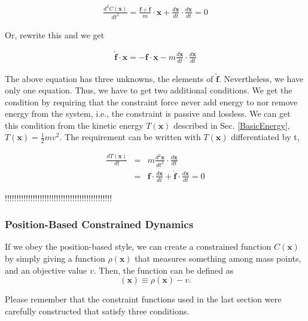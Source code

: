 \documentclass[pdflatex,sn-mathphys-num]{sn-jnl}%
\theoremstyle{thmstyleone}%
\theoremstyle{thmstyletwo}%
\theoremstyle{thmstylethree}%
\begin{document}
\begin{eqnarray}
	\frac{d^2 C(\boldsymbol{x})}{dt^2} = \frac{\boldsymbol{f}+\boldsymbol{\hat{f}}}{m}\cdot \boldsymbol{x} + \frac{d\boldsymbol{x}}{dt}\cdot\frac{d\boldsymbol{x}}{dt} = 0
\end{eqnarray}
 
Or, rewrite this and we get

\begin{eqnarray}
	\boldsymbol{\hat{f}} \cdot \boldsymbol{x} = -\boldsymbol{f}\cdot\boldsymbol{x} - m \frac{d\boldsymbol{x}}{dt}\cdot\frac{d\boldsymbol{x}}{dt}
\end{eqnarray}

The above equation has three unknowns, the elements of $\boldsymbol{\hat{f}}$. Nevertheless, we have only one equation. Thus, we have to get two additional conditions. We get the condition by requiring that the constraint force never add energy to nor remove energy from the system, i.e., the constraint is passive and lossless. We can get this condition from the kinetic energy $T(\boldsymbol{x})$ described in Sec. \ref{BasicEnergy},  $T(\boldsymbol{x}) = \frac{1}{2}m v^2$. The requirement can be written with $T(\boldsymbol{x})$ differentiated by t,

\begin{eqnarray}
	\frac{dT(\boldsymbol{x})}{dt} &=& m\frac{d^2\boldsymbol{x}}{dt^2}\cdot \frac{d\boldsymbol{x}}{dt}\nonumber\\
	&=& \boldsymbol{f} \cdot \frac{d\boldsymbol{x}}{dt}+ \boldsymbol{\hat{f}}\cdot \frac{d\boldsymbol{x}}{dt} = 0
\end{eqnarray}

!!!!!!!!!!!!!!!!!!!!!!!!!!!!!!!!!!!!!!!!!!!!!!

\subsubsection{Position-Based Constrained Dynamics}
If we obey the position-based style, we can create a constrained function $C(\boldsymbol{x})$ by simply giving a function $\rho(\boldsymbol{x})$ that measures something among mass points, and an objective value $v$. Then, the function can be defined as
\begin{equation}
	(\boldsymbol{x}) \equiv \rho(\boldsymbol{x}) - v.
\end{equation}

Please remember that the constraint functions used in the last section were carefully constructed that satisfy three conditions.
\end{document}
